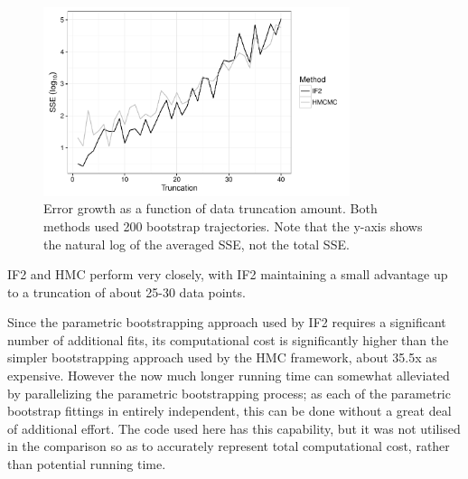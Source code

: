 	\begin{figure}
        \centering
        \captionsetup{width=.8\linewidth}
        \includegraphics[width=0.8\textwidth]{./images/truncation.pdf}
        \caption{Error growth as a function of data truncation amount. Both methods used 200 bootstrap trajectories. Note that the y-axis shows the natural log of the averaged SSE, not the total SSE. \label{truncation}}
    \end{figure}

    IF2 and HMC perform very closely, with IF2 maintaining a small advantage up to a truncation of about 25-30 data points.

    Since the parametric bootstrapping approach used by IF2 requires a significant number of additional fits, its computational cost is significantly higher than the simpler bootstrapping approach used by the HMC framework, about 35.5x as expensive. However the now much longer running time can somewhat alleviated by parallelizing the parametric bootstrapping process; as each of the parametric bootstrap fittings in entirely independent, this can be done without a great deal of additional effort. The code used here has this capability, but it was not utilised in the comparison so as to accurately represent total computational cost, rather than potential running time.